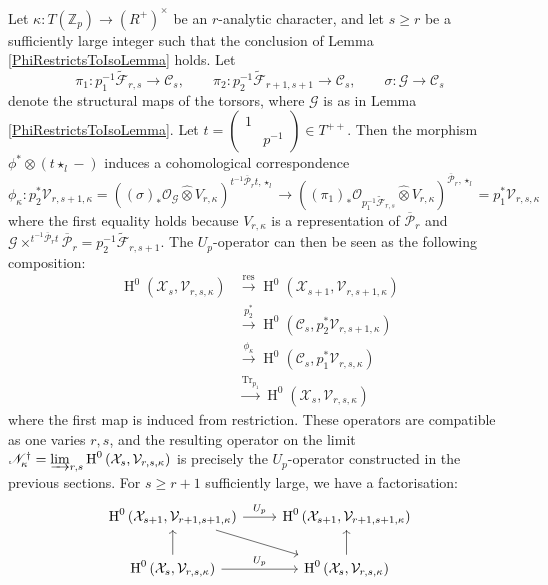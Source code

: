 \documentclass[10pt, oneside]{amsart}
\renewcommand{\tilde}{\widetilde}
\numberwithin{equation}{subsection}
\theoremstyle{definition}
\theoremstyle{remark}
\newcommand{\mbb}[1]{\mathbb{#1}}
\newcommand{\hatot}{\hat{\otimes}}
\newcommand{\opn}[1]{\operatorname{#1}}
\begin{document}
Let $\kappa \colon T(\mbb{Z}_p) \to (R^+)^{\times}$ be an $r$-analytic character, and let $s \geq r$ be a sufficiently large integer such that the conclusion of Lemma \ref{PhiRestrictsToIsoLemma} holds. Let 
\[
\pi_1 \colon p_1^{-1}\tilde{\mathcal{F}}_{r, s} \to \mathcal{C}_s, \quad \quad \pi_2 \colon p_2^{-1}\tilde{\mathcal{F}}_{r+1, s+1} \to \mathcal{C}_s, \quad \quad \sigma \colon \mathscr{G} \to \mathcal{C}_s
\]
denote the structural maps of the torsors, where $\mathscr{G}$ is as in Lemma \ref{PhiRestrictsToIsoLemma}. Let $t = \left( \begin{smallmatrix} 1 & \\ & p^{-1} \end{smallmatrix} \right) \in T^{++}$. Then the morphism $\phi^* \otimes (t \star_l - )$ induces a cohomological correspondence
\[
\phi_{\kappa} \colon p_2^* \mathcal{V}_{r, s+1, \kappa} = \left( (\sigma)_* \mathcal{O}_{\mathscr{G}} \hatot V_{r, \kappa} \right)^{t^{-1} \overline{\mathcal{P}}_r t, \star_l} \to \left( (\pi_1)_* \mathcal{O}_{p_1^{-1}\tilde{\mathcal{F}}_{r, s}} \hatot V_{r, \kappa} \right)^{\overline{\mathcal{P}}_{r}, \star_l} = p_1^* \mathcal{V}_{r, s, \kappa} 
\]
where the first equality holds because $V_{r, \kappa}$ is a representation of $\overline{\mathcal{P}}_r$ and $\mathscr{G} \times^{t^{-1} \overline{\mathcal{P}}_r t} \overline{\mathcal{P}}_r = p_2^{-1}\tilde{\mathcal{F}}_{r, s+1}$. The $U_p$-operator can then be seen as the following composition:
\begin{align*}
    \opn{H}^0\left( \mathcal{X}_s, \mathcal{V}_{r, s, \kappa} \right) &\xrightarrow{\opn{res}} \opn{H}^0\left( \mathcal{X}_{s+1}, \mathcal{V}_{r, s+1, \kappa} \right) \\ 
     &\xrightarrow{p_2^*} \opn{H}^0\left( \mathcal{C}_{s}, p_2^*\mathcal{V}_{r, s+1, \kappa} \right) \\
     &\xrightarrow{\phi_{\kappa}} \opn{H}^0\left( \mathcal{C}_{s}, p_1^*\mathcal{V}_{r, s, \kappa} \right) \\
     &\xrightarrow{\opn{Tr}_{p_1}} \opn{H}^0\left( \mathcal{X}_s, \mathcal{V}_{r, s, \kappa} \right)
\end{align*}
where the first map is induced from restriction. These operators are compatible as one varies $r, s$, and the resulting operator on the limit $\mathscr{N}^{\dagger}_{\kappa} = \varinjlim_{r, s} \opn{H}^0\left( \mathcal{X}_s, \mathcal{V}_{r, s, \kappa} \right)$ is precisely the $U_p$-operator constructed in the previous sections. For $s \geq r+1$ sufficiently large, we have a factorisation:
\begin{equation} \label{FactorisationOfUpEqn}
\begin{tikzcd}
{\opn{H}^0\left( \mathcal{X}_{s+1}, \mathcal{V}_{r+1, s+1, \kappa} \right)} \arrow[r, "U_p"] \arrow[rd] & {\opn{H}^0\left( \mathcal{X}_{s+1}, \mathcal{V}_{r+1, s+1, \kappa} \right)}   \\
{\opn{H}^0\left( \mathcal{X}_s, \mathcal{V}_{r, s, \kappa} \right)} \arrow[r, "U_p"] \arrow[u]          & {\opn{H}^0\left( \mathcal{X}_s, \mathcal{V}_{r, s, \kappa} \right)} \arrow[u]
\end{tikzcd}
\end{equation}
\end{document}
